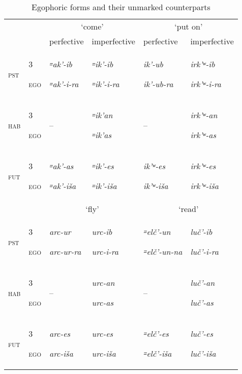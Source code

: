 \documentclass[output=paper]{langsci/langscibook}
\begin{document}
\begin{table}
\advance{}
  \caption{Egophoric forms and their unmarked counterparts}\label{tab:4:2}
\begin{tabular}{@{}lm{}<{\raggedright}m{}<{\raggedright}m{}<{\raggedright}m{}<{\raggedright}m{}<{\raggedright}@{}}
\toprule
  & & \multicolumn{2}{c}{`come'} & \multicolumn{2}{c}{`put on'} \tabularnewline
 \cmidrule(lr){3-4} \cmidrule(l){5-6}
& & perfective & imperfective & perfective & imperfective\tabularnewline\midrule

\textsc{pst} & 
3

\textsc{ego} & 
\emph{꞊ak'-ib}

\emph{꞊ak'-i-ra} & 
\emph{꞊ik'-ib}

\emph{꞊ik'-i-ra} & 
\emph{ik'-ub}

\emph{ik'-ub-ra} & 
\emph{irk'ʷ-ib}

\emph{irk'ʷ-i-ra}\tabularnewline

\textsc{hab} & 
3

\textsc{ego} & 
– & 
\emph{꞊ik'an}

\emph{꞊ik'as} & 
– & 
\emph{irk'ʷ-an}

\emph{irk'ʷ-as}\tabularnewline
\textsc{fut} & 
3

\textsc{ego} & 
\emph{꞊ak'-as}

\emph{꞊ak'-iša} & 
\emph{꞊ik'-es}

\emph{꞊ik'-iša} & 
\emph{ik'ʷ-es}

\emph{ik'ʷ-iša} & 
\emph{irk'ʷ-es}

\emph{irk'ʷ-iša}\tabularnewline \midrule
  & & \multicolumn{2}{c}{`fly'} & \multicolumn{2}{c}{`read'} \tabularnewline
 \cmidrule(lr){3-4} \cmidrule(l){5-6}                                  
\textsc{pst} & 
3

\textsc{ego} & 
\emph{arc-ur}

\emph{arc-ur-ra} & 
\emph{urc-ib}

\emph{urc-i-ra} & 
\emph{꞊elč'-un}

\emph{꞊elč'-un-na} & 
\emph{luč'-ib}

\emph{luč'-i-ra}\tabularnewline

\textsc{hab} & 
3

\textsc{ego} & 
– & 
\emph{urc-an}

\emph{urc-as} & 
– & 
\emph{luč'-an}

\emph{luč'-as}\tabularnewline

\textsc{fut} & 
3

\textsc{ego} & 
\emph{arc-es}

\emph{arc-iša} & 
\emph{urc-es}

\emph{urc-iša} & 
\emph{꞊elč'-es}

\emph{꞊elč'-iša} & 
\emph{luč'-es}

\emph{luč'-iša}\tabularnewline
\bottomrule
\end{tabular}
\end{table}
\end{document}
